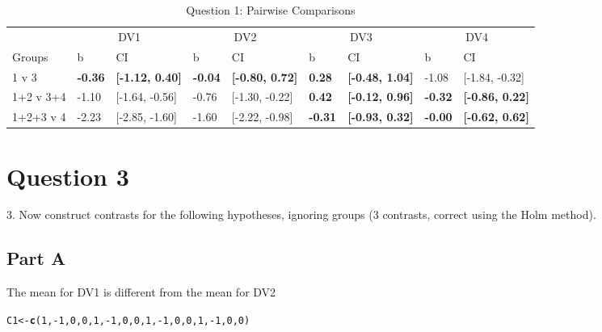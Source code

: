 \documentclass{article}\usepackage[]{graphicx}\usepackage[]{color}
\makeatletter
\newcommand{\hlnum}[1]{\textcolor[rgb]{0.686,0.059,0.569}{#1}}%
\newcommand{\hlopt}[1]{\textcolor[rgb]{0,0,0}{#1}}%
\newcommand{\hlstd}[1]{\textcolor[rgb]{0.345,0.345,0.345}{#1}}%
\newcommand{\hlkwb}[1]{\textcolor[rgb]{0.69,0.353,0.396}{#1}}%
\newcommand{\hlkwd}[1]{\textcolor[rgb]{0.737,0.353,0.396}{\textbf{#1}}}%
\newenvironment{kframe}{%
 \def\at@end@of@kframe{}%
 \ifinner\ifhmode%
  \def\at@end@of@kframe{\end{minipage}}%
  \begin{minipage}{\columnwidth}%
 \fi\fi%
 \def\FrameCommand##1{\hskip\@totalleftmargin \hskip-\fboxsep
 \colorbox{shadecolor}{##1}\hskip-\fboxsep
     \hskip-\linewidth \hskip-\@totalleftmargin \hskip\columnwidth}%
 \MakeFramed {\advance\hsize-\width
   \@totalleftmargin\z@ \linewidth\hsize
   \@setminipage}}%
 {\par\unskip\endMakeFramed%
 \at@end@of@kframe}
\newenvironment{knitrout}{}{} %
\makeatother
\begin{document}
\begin{knitrout}
\begin{table}
\caption{\label{tab:unnamed-chunk-10}Question 1: Pairwise Comparisons}
\centering
\begin{tabular}[t]{lllllllll}
\toprule
\multicolumn{1}{c}{ } & \multicolumn{2}{c}{DV1} & \multicolumn{2}{c}{DV2} & \multicolumn{2}{c}{DV3} & \multicolumn{2}{c}{DV4} \\
\cmidrule(l{2pt}r{2pt}){2-3} \cmidrule(l{2pt}r{2pt}){4-5} \cmidrule(l{2pt}r{2pt}){6-7} \cmidrule(l{2pt}r{2pt}){8-9}
Groups & b & CI & b & CI & b & CI & b & CI\\
\midrule
1 v 3 & \textbf{-0.36} & \textbf{[-1.12, 0.40]} & \textbf{-0.04} & \textbf{[-0.80, 0.72]} & \textbf{0.28} & \textbf{[-0.48, 1.04]} & -1.08 & [-1.84, -0.32]\\
1+2 v 3+4 & -1.10 & [-1.64, -0.56] & -0.76 & [-1.30, -0.22] & \textbf{0.42} & \textbf{[-0.12, 0.96]} & \textbf{-0.32} & \textbf{[-0.86, 0.22]}\\
1+2+3 v 4 & -2.23 & [-2.85, -1.60] & -1.60 & [-2.22, -0.98] & \textbf{-0.31} & \textbf{[-0.93, 0.32]} & \textbf{-0.00} & \textbf{[-0.62, 0.62]}\\
\bottomrule
\end{tabular}
\end{table}


\end{knitrout}


\section{Question 3}
3. Now construct contrasts for the following hypotheses, ignoring groups (3 contrasts, correct using the Holm method).

\subsection{Part A}
The mean for DV1 is different from the mean for DV2
\begin{knitrout}
\color{fgcolor}\begin{kframe}
\begin{alltt}
\hlstd{C1} \hlkwb{<-} \hlkwd{c}\hlstd{(}\hlnum{1}\hlstd{,}\hlopt{-}\hlnum{1}\hlstd{,}\hlnum{0}\hlstd{,}\hlnum{0}\hlstd{,} \hlnum{1}\hlstd{,}\hlopt{-}\hlnum{1}\hlstd{,}\hlnum{0}\hlstd{,}\hlnum{0}\hlstd{,} \hlnum{1}\hlstd{,}\hlopt{-}\hlnum{1}\hlstd{,}\hlnum{0}\hlstd{,}\hlnum{0}\hlstd{,} \hlnum{1}\hlstd{,}\hlopt{-}\hlnum{1}\hlstd{,}\hlnum{0}\hlstd{,}\hlnum{0}\hlstd{)}
\end{alltt}
\end{kframe}
\end{knitrout}
\end{document}
